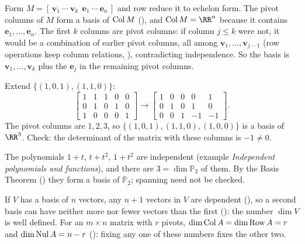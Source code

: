 \documentclass[10pt]{scrartcl}
\newcommand{\vv}[1]{\mathbf{#1}}
\begin{document}
\begin{steps}
  \ii Form $M=[\,\vv v_1\ \cdots\ \vv v_k\ \ \vv e_1\ \cdots\ \vv e_n\,]$ and row reduce it to echelon form.
  \ii The pivot columns of $M$ form a basis of $\operatorname{Col} M$ (), and $\Col M=\RR^n$ because it contains $\vv e_1,\dots,\vv e_n$.
  \ii The first $k$ columns are pivot columns: if column $j\le k$ were not, it would be a combination of earlier pivot columns, all among $\vv v_1,\dots,\vv v_{j-1}$ (row operations keep column relations, ), contradicting independence. So the basis is $\vv v_1,\dots,\vv v_k$ plus the $\vv e_j$ in the remaining pivot columns.
\end{steps}

\begin{example*}
Extend $\{(1,0,1),(1,1,0)\}$:
\[
  \begin{bmatrix}1&1&1&0&0\\0&1&0&1&0\\1&0&0&0&1\end{bmatrix}
  \longrightarrow
  \begin{bmatrix}1&0&0&0&1\\0&1&0&1&0\\0&0&1&-1&-1\end{bmatrix}.
\]
The pivot columns are $1,2,3$, so $\{(1,0,1),(1,1,0),(1,0,0)\}$ is a basis of $\RR^3$. Check: the determinant of the matrix with these columns is $-1\ne0$.
\end{example*}

\begin{example*}
The polynomials $1+t$, $t+t^2$, $1+t^2$ are independent (example \emph{Independent polynomials and functions}), and there are $3=\dim\mathbb P_2$ of them. By the Basis Theorem () they form a basis of $\mathbb P_2$; spanning need not be checked.
\end{example*}

\revisit
If $V$ has a basis of $n$ vectors, any $n+1$ vectors in $V$ are dependent (), so a second basis can have neither more nor fewer vectors than the first (): the number $\dim V$ is well defined. For an $m\times n$ matrix with $r$ pivots, $\dim\operatorname{Col} A=\dim\operatorname{Row} A=r$ and $\dim\operatorname{Nul} A=n-r$ (): fixing any one of these numbers fixes the other two.
\end{document}
